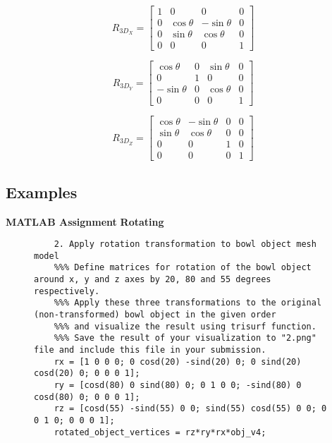 \begin{equation}
\label{eqn:crossprodLine}
R_{3D_X} = \begin{bmatrix}
1 & 0 & 0 & 0\\ 
0 & \cos{\theta} & -\sin{\theta} & 0\\ 
0 & \sin{\theta} & \cos{\theta} & 0\\
0 & 0 & 0 & 1 
\end{bmatrix}
\end{equation}

\begin{equation}
\label{eqn:crossprodLine}
R_{3D_Y} = \begin{bmatrix}
\cos{\theta} & 0 & \sin{\theta} & 0\\ 
0 & 1 & 0 & 0\\ 
-\sin{\theta} & 0 & \cos{\theta} & 0\\
0 & 0 & 0 & 1 
\end{bmatrix}
\end{equation}

\begin{equation}
\label{eqn:crossprodLine}
R_{3D_Z} = \begin{bmatrix}
\cos{\theta} & -\sin{\theta} & 0 & 0\\ 
\sin{\theta} & \cos{\theta} & 0 & 0\\ 
0 & 0 & 1 & 0\\
0 & 0 & 0 & 1
\end{bmatrix}
\end{equation}
\subsection{Examples}
\textbf{MATLAB Assignment}
\textbf{Rotating}
\begin{figure}[!hbt]
	\begin{lstlisting}
	2. Apply rotation transformation to bowl object mesh model
	%%% Define matrices for rotation of the bowl object around x, y and z axes by 20, 80 and 55 degrees respectively. 
	%%% Apply these three transformations to the original (non-transformed) bowl object in the given order 
	%%% and visualize the result using trisurf function. 
	%%% Save the result of your visualization to "2.png" file and include this file in your submission.
	rx = [1 0 0 0; 0 cosd(20) -sind(20) 0; 0 sind(20) cosd(20) 0; 0 0 0 1];
	ry = [cosd(80) 0 sind(80) 0; 0 1 0 0; -sind(80) 0 cosd(80) 0; 0 0 0 1];
	rz = [cosd(55) -sind(55) 0 0; sind(55) cosd(55) 0 0; 0 0 1 0; 0 0 0 1];
	rotated_object_vertices = rz*ry*rx*obj_v4;
	\end{lstlisting}	
\end{figure}

